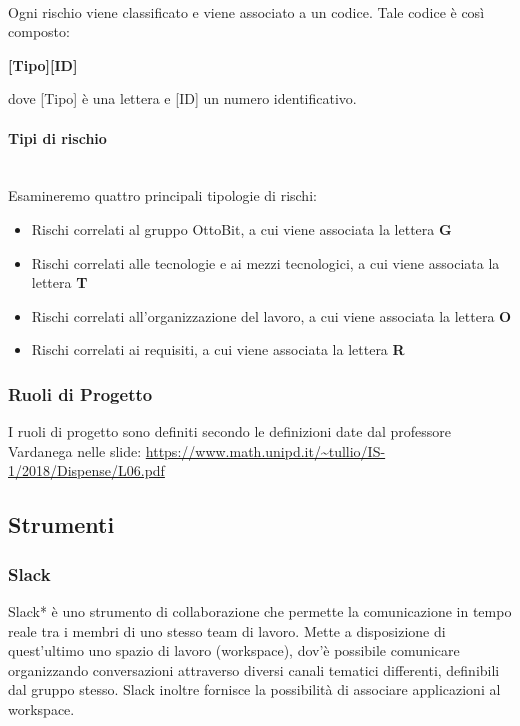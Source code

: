 \documentclass[11pt,a4paper]{article}
\begin{document}
\noindent \\
 Ogni rischio viene classificato e viene associato a un codice. Tale codice è così composto:
\begin{center}
	\textbf{[Tipo][ID]}
\end{center}
dove [Tipo] è una lettera e [ID] un numero identificativo.\\

\paragraph{Tipi di rischio} 
\noindent \\
 Esamineremo quattro principali tipologie di rischi:

\begin{itemize}
	\item Rischi correlati al gruppo OttoBit, a cui viene associata la lettera \textbf{G}
	\item Rischi correlati alle tecnologie e ai mezzi tecnologici, a cui viene associata la lettera \textbf{T}
	\item Rischi correlati all'organizzazione del lavoro, a cui viene associata la lettera \textbf{O}
	\item Rischi correlati ai requisiti, a cui viene associata la lettera \textbf{R}
\end{itemize}

\subsubsection{Ruoli di Progetto}
I ruoli di progetto sono definiti secondo le definizioni date dal professore Vardanega nelle slide:
\url{https://www.math.unipd.it/~tullio/IS-1/2018/Dispense/L06.pdf}

\newpage

\subsection{Strumenti}

\subsubsection{Slack}
Slack* è uno strumento di collaborazione che permette la comunicazione in tempo reale tra i membri di uno stesso team di lavoro. Mette a disposizione di quest’ultimo uno spazio di lavoro (workspace), dov'è possibile comunicare organizzando conversazioni attraverso diversi canali tematici differenti, definibili dal gruppo stesso.
Slack inoltre fornisce la possibilità di associare applicazioni al workspace.
\end{document}
